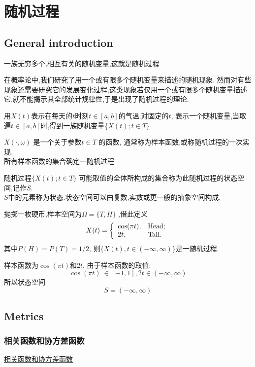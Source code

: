 \chapter{随机过程}
\section{General introduction}
一族无穷多个,相互有关的随机变量,这就是随机过程

在概率论中,我们研究了用一个或有限多个随机变量来描述的随机现象.
然而对有些现象还需要研究它的发展变化过程,这类现象若仅用一个或有限多个随机变量描述它,就不能揭示其全部统计规律性,于是出现了随机过程的理论.
\begin{example}
用$X(t)$表示在每天的$t$时刻$t \in [a, b]$的气温.对固定的$t$,
表示一个随机变量,当取遍$t \in [a,b ]$时,得到一族随机变量$\{X(t); t \in T\}$
\end{example}

$X(\cdot, \omega)$ 是一个关于参数$t \in T$ 的函数, 通常称为样本函数,或称随机过程的一次实现.\\
所有样本函数的集合确定一随机过程

随机过程$\{X(t);t \in T\}$ 可能取值的全体所构成的集合称为此随机过程的状态空间,记作$S$.\\
$S$中的元素称为状态.状态空间可以由复数,实数或更一般的抽象空间构成.

\begin{example}
抛掷一枚硬币,样本空间为$\Omega = \{T, H\}$ ,借此定义
$$
X(t)=
\left\{
  \begin{array}{ll}
   \cos(\pi t) , & \hbox{Head;} \\
    2t, & \hbox{Tail.}
  \end{array}
\right.
$$
其中$P(H)=P(T)=1/2$, 则$\{X(t), t \in (-\infty, \infty)\}$是一随机过程.

样本函数为$\cos(\pi t)$和$2t$, 由于样本函数的取值:
$$\cos(\pi t)\ \in [-1,1], 2t \in (-\infty, \infty)$$
所以状态空间
$$S=(-\infty, \infty)$$
\end{example}

\section{Metrics}
\subsection{相关函数和协方差函数}
\href{http://202.117.122.42:9001/xhxt/xhyxt/xuexi/chart9/c\_9\_3\_2\_001.htm}{相关函数和协方差函数}

